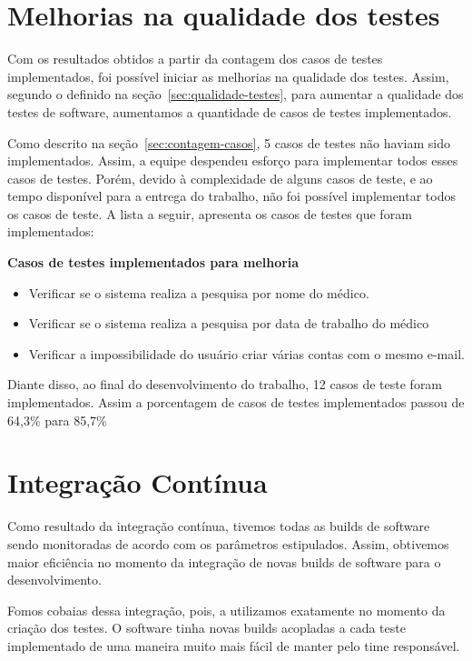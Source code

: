 \section{Melhorias na qualidade dos testes}
Com os resultados obtidos a partir da contagem dos casos de testes implementados,
foi possível iniciar as melhorias na qualidade dos testes. Assim, segundo o
definido na seção~\ref{sec:qualidade-testes}, para aumentar a qualidade dos
testes de software, aumentamos a quantidade de casos de testes implementados.

Como descrito na seção~\ref{sec:contagem-casos}, 5 casos de testes não haviam
sido implementados. Assim, a equipe despendeu esforço para implementar todos
esses casos de testes. Porém, devido à complexidade de alguns casos de teste,
e ao tempo disponível para a entrega do trabalho, não foi possível implementar
todos os casos de teste. A lista a seguir, apresenta os casos de testes que
foram implementados:

\textbf{Casos de testes implementados para melhoria}
\begin{itemize}
	\item Verificar se o sistema realiza a pesquisa por nome do médico.
	\item Verificar se o sistema realiza a pesquisa por data de trabalho do
        médico
	\item Verificar a impossibilidade do usuário criar várias contas com o
        mesmo e-mail.
\end{itemize}

Diante disso, ao final do desenvolvimento do trabalho, 12 casos de teste foram
implementados. Assim a porcentagem de casos de testes implementados passou de
64,3\% para 85,7\%

\section{Integração Contínua}
\label{sec:Integração Contínua}

Como resultado da integração contínua, tivemos todas as builds de software sendo
monitoradas de acordo com os parâmetros estipulados. Assim, obtivemos maior
eficiência no momento da integração de novas builds de software para o desenvolvimento.

Fomos cobaias dessa integração, pois, a utilizamos exatamente no momento da
criação dos testes. O software tinha novas builds acopladas a cada teste implementado
de uma maneira muito mais fácil de manter pelo time responsável.

